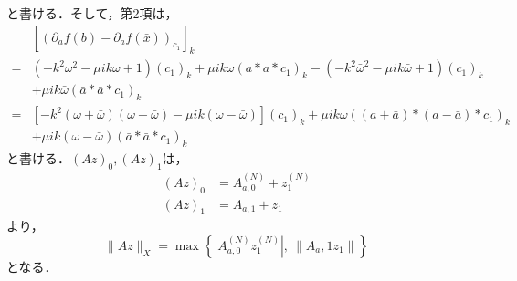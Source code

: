 \documentclass[11pt,a4paper,titlepage]{jsreport}
\theoremstyle{definition}
\begin{document}
と書ける．そして，第2項は，
\begin{equation*}
  \begin{split}
    &\left[ \left( \partial_a f(b) - \partial_a f(\bar{x}) \right)_{c_1} \right]_k \\
    =& \left( -k^2\omega^2 - \mu ik \omega + 1 \right) \left( c_1 \right)_k + \mu ik \omega (a * a * c_1)_k - \left( -k^2\bar{\omega}^2 - \mu ik \bar{\omega} + 1 \right) \left( c_1 \right)_k \\
    &+ \mu ik \bar{\omega} (\bar{a} * \bar{a} * c_1)_k \\
    =& \left[ -k^2\left(\omega + \bar{\omega}\right) \left(\omega - \bar{\omega}\right) - \mu ik \left(\omega - \bar{\omega}\right) \right] \left(c_1\right)_k + \mu ik \omega \left(\left(a+\bar{a}\right)*\left(a-\bar{a}\right)*c_1\right)_k \\
    &+ \mu ik \left(\omega - \bar{\omega}\right) \left( \bar{a} * \bar{a} * c_1 \right)_k
  \end{split}
\end{equation*}
と書ける．$(Az)_0,(Az)_1$は，
\begin{align*}
  (Az)_0 & = A_{a,0}^{(N)} + z_1^{(N)} \\
  (Az)_1 & = A_{a,1} + z_1
\end{align*}
より，
\begin{equation*}
  \|Az\|_X = \max\left\{ \left| A_{a,0}^{(N)} z_1^{(N)} \right|,\ \left\| A_a,1 z_1 \right\| \right\}
\end{equation*}
となる．
\end{document}
